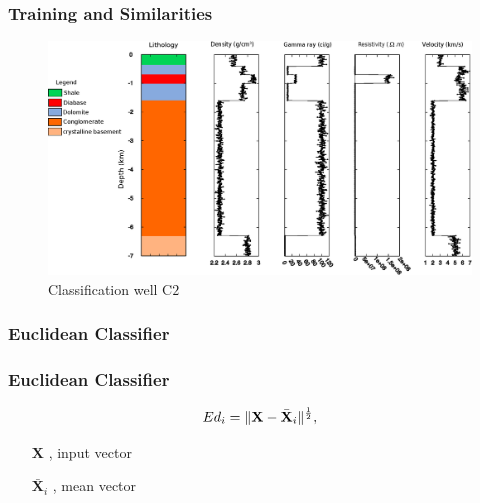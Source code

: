 \documentclass[aspectratio=10]{beamer} %
\begin{document}
\begin{frame}
\frametitle{Training and Similarities}
\begin{figure}[H]
	\centering
	\includegraphics[scale=0.39]{Imagens/Pococ2.eps}
	\caption{Classification well C$2$}
	\label{C2}
\end{figure}
\end{frame}



\subsubsection{Euclidean Classifier}

\begin{frame}
	\frametitle{Euclidean Classifier}
	
	\begin{equation}
	Ed_{i} =  \Arrowvert \textbf{X}-\bar{\textbf{X}}_{i}  \Arrowvert^{\frac{1}{2}}, 
	\label{eq4}
	\end{equation}  
	 \pause
	\begin{itemize}
		\centering
		\item[$\textbf{X}$], input vector 
		\pause
		\item[$\bar{\textbf{X}}_{i}$], mean vector
	\end{itemize}
	
\end{frame}
  
\end{document}
